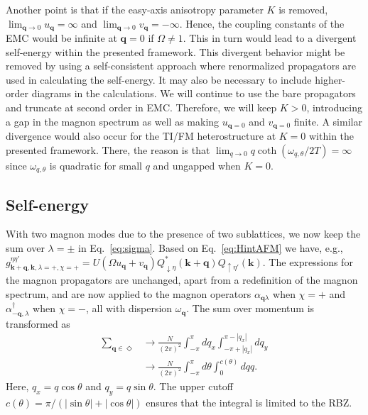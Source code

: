 \documentclass[aps, prb, twocolumn,amsmath,amssymb,floatfix]{revtex4-2}
\begin{document}
Another point is that if the easy-axis anisotropy parameter $K$ is removed, $\lim_{\boldsymbol{q}\to 0}u_{\boldsymbol{q}} = \infty$ and $\lim_{\boldsymbol{q}\to 0}v_{\boldsymbol{q}} = -\infty$. Hence, the coupling constants of the EMC would be infinite at $\boldsymbol{q} = 0$ if $\Omega \neq 1$. This in turn would lead to a divergent self-energy within the presented framework. This divergent behavior might be removed by using a self-consistent approach where renormalized propagators are used in calculating the self-energy. It may also be necessary to include higher-order diagrams in the calculations. We will continue to use the bare propagators and truncate at second order in EMC. Therefore, we will keep $K > 0$, introducing a gap in the magnon spectrum as well as making $u_{\boldsymbol{q}=0}$ and $v_{\boldsymbol{q}=0}$ finite. A similar divergence would also occur for the TI/FM heterostructure at $K=0$ within the presented framework. There, the reason is that $\lim_{q\to0} q\coth(\omega_{q, \theta}/2T) = \infty$ since $\omega_{q, \theta}$ is quadratic for small $q$ and ungapped when $K=0$. 



\subsection{Self-energy}
With two magnon modes due to the presence of two sublattices, we now keep the sum over $\lambda = \pm$ in Eq.~\eqref{eq:sigma}. Based on Eq.~\eqref{eq:HintAFM} we have, e.g., $g_{\boldsymbol{k}+\boldsymbol{q}, \boldsymbol{k}, \lambda = +, \chi = +}^{\eta\eta'} = U(\Omega u_{\boldsymbol{q}}+ v_{\boldsymbol{q}})Q_{\downarrow \eta}^*(\boldsymbol{k}+\boldsymbol{q}) Q_{\uparrow \eta'}(\boldsymbol{k})$. The expressions for the magnon propagators are unchanged, apart from a redefinition of the magnon spectrum, and are now applied to the magnon operators $\alpha_{\boldsymbol{q}\lambda}$ when $\chi = +$ and $\alpha_{-\boldsymbol{q},\lambda}^\dagger$ when $\chi = -$, all with dispersion $\omega_{\boldsymbol{q}}$. The sum over momentum is transformed as
\begin{align}
    \sum_{\boldsymbol{q} \in \Diamond} &\to \frac{N}{(2\pi)^2}\int_{-\pi}^{\pi} dq_x \int_{-\pi+|q_x|}^{\pi-|q_x|} dq_y \nonumber \\
    &\to \frac{N}{(2\pi)^2} \int_{-\pi}^{\pi} d\theta \int_0^{c(\theta)} dq q.
\end{align}
Here, $q_x = q\cos\theta$ and $q_y = q\sin\theta$. The upper cutoff $c(\theta) = \pi/(|\sin\theta|+|\cos\theta|)$ ensures that the integral is limited to the RBZ.
\end{document}
